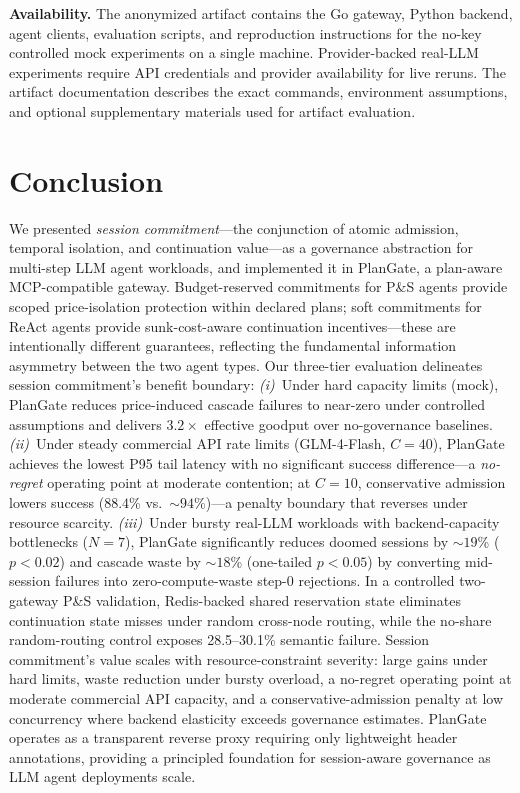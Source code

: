 \documentclass[sigconf,review,anonymous]{acmart}
\begin{document}
\textbf{Availability.}
The anonymized artifact contains the Go gateway, Python backend, agent clients, evaluation scripts, and reproduction instructions for the no-key controlled mock experiments on a single machine. Provider-backed real-LLM experiments require API credentials and provider availability for live reruns. The artifact documentation describes the exact commands, environment assumptions, and optional supplementary materials used for artifact evaluation.

\section{Conclusion}

We presented \emph{session commitment}---the conjunction of atomic admission, temporal isolation, and continuation value---as a governance abstraction for multi-step LLM agent workloads, and implemented it in PlanGate, a plan-aware MCP-compatible gateway. Budget-reserved commitments for P\&S agents provide scoped price-isolation protection within declared plans; soft commitments for ReAct agents provide sunk-cost-aware continuation incentives---these are intentionally different guarantees, reflecting the fundamental information asymmetry between the two agent types. Our three-tier evaluation delineates session commitment's benefit boundary:
\emph{(i)}~Under hard capacity limits (mock), PlanGate reduces price-induced cascade failures to near-zero under controlled assumptions and delivers $3.2\times$ effective goodput over no-governance baselines.
\emph{(ii)}~Under steady commercial API rate limits (GLM-4-Flash, $C{=}40$), PlanGate achieves the lowest P95 tail latency with no significant success difference---a \emph{no-regret} operating point at moderate contention; at $C{=}10$, conservative admission lowers success ($88.4$\% vs.\ ${\sim}94$\%)---a penalty boundary that reverses under resource scarcity.
\emph{(iii)}~Under bursty real-LLM workloads with backend-capacity bottlenecks ($N{=}7$), PlanGate significantly reduces doomed sessions by ${\sim}19$\% ($p{<}0.02$) and cascade waste by ${\sim}18$\% (one-tailed $p{<}0.05$) by converting mid-session failures into zero-compute-waste step-0 rejections.
In a controlled two-gateway P\&S validation, Redis-backed shared reservation state eliminates continuation state misses under random cross-node routing, while the no-share random-routing control exposes 28.5--30.1\% semantic failure.
Session commitment's value scales with resource-constraint severity: large gains under hard limits, waste reduction under bursty overload, a no-regret operating point at moderate commercial API capacity, and a conservative-admission penalty at low concurrency where backend elasticity exceeds governance estimates. PlanGate operates as a transparent reverse proxy requiring only lightweight header annotations, providing a principled foundation for session-aware governance as LLM agent deployments scale.
\end{document}
